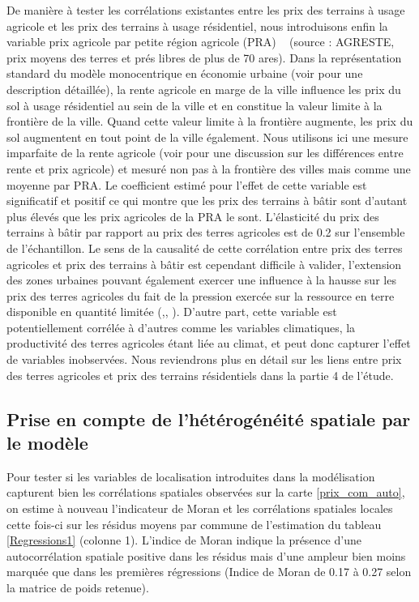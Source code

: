 \documentclass[10.5pt,a4paper]{article}
\begin{document}
{De manière à tester les corrélations existantes entre les prix des terrains à usage agricole et les prix des terrains à usage résidentiel, nous introduisons enfin la variable  \og prix agricole par petite région agricole (PRA) \fg~ (source : AGRESTE, prix moyens des terres et prés libres de plus de 70 ares). Dans la représentation standard du modèle monocentrique en économie urbaine (voir \cite{Brueckner87} pour une description détaillée), la rente agricole en marge de la ville influence les prix du sol à usage résidentiel au sein de la ville et en constitue la valeur limite à la frontière de la ville. Quand cette valeur limite à la frontière augmente, les prix du sol augmentent en tout point de la ville également. Nous utilisons ici une mesure imparfaite de la rente agricole (voir \cite{Cava03} pour une discussion sur les différences entre rente et prix agricole) et mesuré non pas à la frontière des villes mais comme une moyenne par PRA. Le coefficient estimé pour l'effet de cette variable est significatif et positif ce qui montre que les prix des terrains à bâtir sont d'autant plus élevés que les prix agricoles de la PRA le sont. L'élasticité du prix des terrains à bâtir par rapport au prix des terres agricoles est de 0.2 sur l'ensemble de l'échantillon. Le sens de la causalité de cette corrélation entre prix des terres agricoles et prix des terrains à bâtir est cependant difficile à valider, l'extension des zones urbaines pouvant également exercer une influence à la hausse sur les prix des terres agricoles du fait de la pression exercée sur la ressource en terre disponible en quantité limitée (\cite{Cava03},\cite{Geniaux05}, \cite{LefeRouq11}). D'autre part, cette variable est potentiellement corrélée à d'autres comme les variables climatiques, la productivité des terres agricoles étant liée au climat, et peut donc capturer l'effet de variables inobservées. Nous reviendrons plus en détail sur les liens entre prix des terres agricoles et prix des terrains résidentiels dans la partie 4 de l'étude.\par  

\subsection{Prise en compte de l'hétérogénéité spatiale par le modèle}

Pour tester si les variables de localisation introduites dans la modélisation capturent bien les corrélations spatiales observées sur la carte \ref{prix_com_auto}, on estime à nouveau l'indicateur de Moran et les corrélations spatiales locales cette fois-ci sur les résidus moyens par commune de l'estimation du tableau \ref{Regressions1} (colonne 1). L'indice de Moran indique la présence d'une autocorrélation spatiale positive dans les résidus mais d'une ampleur bien moins marquée que dans les premières régressions (Indice de Moran de 0.17 à 0.27 selon la matrice de poids retenue). \par  

}
\end{document}
